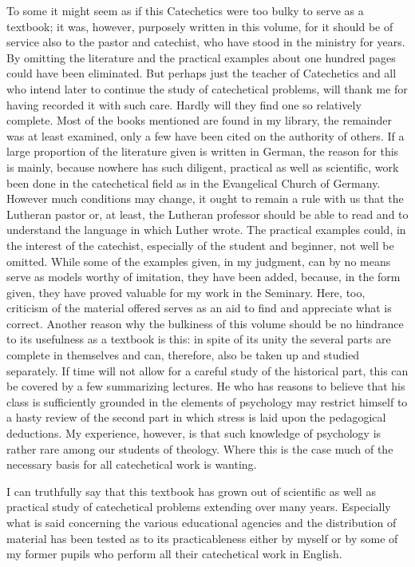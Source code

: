 To some it might seem as if this Catechetics were too bulky to serve as a textbook; it was, however, purposely written in this volume, for it should be of service also to the pastor and catechist, who have stood in the ministry for years. By omitting the literature and the practical examples about one hundred pages could have been eliminated. But perhaps just the teacher of Catechetics and all who intend later to continue the study of catechetical problems, will thank me for having recorded it with such care. Hardly will they find one so relatively complete. Most of the books mentioned are found in my library, the remainder was at least examined, only a few have been cited on the authority of others. If a large proportion of the literature given is written in German, the reason for this is mainly, because nowhere has such diligent, practical as well as scientific, work been done in the catechetical field as in the Evangelical Church of Germany. However much conditions may change, it ought to remain a rule with us that
the Lutheran pastor or, at least, the Lutheran professor should be able to read and to understand the language in which Luther wrote. The practical examples could, in the interest of the catechist, especially of the student and beginner, not well be omitted. While some of the examples given, in my judgment, can by no means serve as models worthy of imitation, they have been added, because, in the form given, they have proved valuable for my work in the Seminary. Here, too, criticism of the material offered serves as an aid to find and appreciate what is correct. Another reason why the bulkiness of this volume should be no hindrance to its usefulness as a textbook is this: in spite of its unity the several parts are complete in themselves and can, therefore, also be taken up and studied separately. If time will not allow for a careful study of the historical part, this can be covered by a few summarizing lectures. He who has reasons to believe that his class is sufficiently grounded in the elements of psychology may restrict himself to a hasty review of the second part in which stress is laid upon the pedagogical deductions. My experience, however, is that such knowledge of psychology is rather rare among our students of theology. Where this is the case much of the necessary basis for all catechetical work is wanting.

I can truthfully say that this textbook has grown out of scientific as well as practical study of catechetical problems extending over many years. Especially what is said concerning the various educational agencies and the distribution of material has been tested as to its practicableness either by myself or by some of my former pupils who perform all their catechetical work in English.

